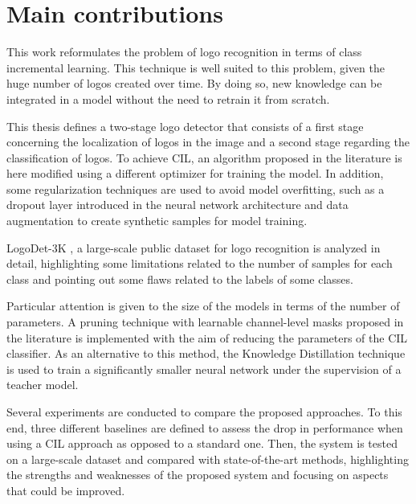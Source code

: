 \section{Main contributions}
This work reformulates the problem of logo recognition in terms of class incremental learning. This technique is well suited to this problem, given the huge number of logos created over time. By doing so, new knowledge can be integrated in a model without the need to retrain it from scratch.

This thesis defines a two-stage logo detector that consists of a first stage concerning the localization of logos in the image and a second stage regarding the classification of logos. 
To achieve CIL, an algorithm proposed in the literature is here modified using a different optimizer for training the model. In addition, some regularization techniques are used to avoid model overfitting, such as a dropout layer introduced in the neural network architecture and data augmentation to create synthetic samples for model training.

LogoDet-3K \cite{wang2022logodet}, a large-scale public dataset for logo recognition is analyzed in detail, highlighting some limitations related to the number of samples for each class and pointing out some flaws related to the labels of some classes.

Particular attention is given to the size of the models in terms of the number of parameters. A pruning technique with learnable channel-level masks proposed in the literature is implemented with the aim of reducing the parameters of the CIL classifier.
As an alternative to this method, the Knowledge Distillation technique is used to train a significantly smaller neural network under the supervision of a teacher model.

Several experiments are conducted to compare the proposed approaches. To this end, three different baselines are defined to assess the drop in performance when using a CIL approach as opposed to a standard one. Then, the system is tested on a large-scale dataset and compared with state-of-the-art methods, highlighting the strengths and weaknesses of the proposed system and focusing on aspects that could be improved.


